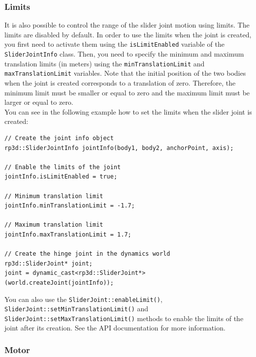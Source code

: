 \documentclass[a4paper,12pt]{article}
\begin{document}
    \subsubsection{Limits}

    It is also possible to control the range of the slider joint motion using limits. The limits are disabled by default. In order to use the limits when the joint is created, you first
    need to activate them using the \texttt{isLimitEnabled} variable of the \texttt{SliderJointInfo} class. Then, you need to specify the minimum and maximum translation limits
    (in meters) using the \texttt{minTranslationLimit} and \texttt{maxTranslation\-Limit} variables. Note that the initial position of the two bodies when the joint is created
    corresponds to a translation of zero. Therefore, the minimum limit must be smaller or equal to zero and the maximum limit must be larger or equal to zero. \\

    You can see in the following example how to set the limits when the slider joint is created: \\

    \begin{lstlisting}
// Create the joint info object
rp3d::SliderJointInfo jointInfo(body1, body2, anchorPoint, axis);

// Enable the limits of the joint
jointInfo.isLimitEnabled = true;

// Minimum translation limit
jointInfo.minTranslationLimit = -1.7;

// Maximum translation limit
jointInfo.maxTranslationLimit = 1.7;

// Create the hinge joint in the dynamics world
rp3d::SliderJoint* joint;
joint = dynamic_cast<rp3d::SliderJoint*>(world.createJoint(jointInfo));
  \end{lstlisting}

    \vspace{0.6cm}

   \begin{sloppypar}
     You can also use the \texttt{SliderJoint::enableLimit()}, \texttt{SliderJoint::\-setMinTranslationLimit()} and \texttt{SliderJoint::setMaxTranslationLimit()} methods to
     enable the limits of the joint after its creation. See the API documentation for more information.
    \end{sloppypar}

    \subsubsection{Motor}
\end{document}

